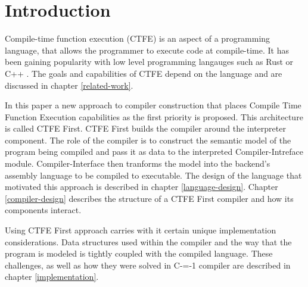 \section{Introduction}


Compile-time function execution (CTFE) is an aspect of a programming language, that allows the programmer to execute code at compile-time.
It has been gaining popularity with low level programming langauges such as Rust \cite{rust} or C++ \cite{ISO:cpp98}.
The goals and capabilities of CTFE depend on the language and are discussed in chapter \ref{related-work}.

In this paper a new approach to compiler construction that places Compile Time Function Execution capabilities as the first priority is proposed.
This architecture is called CTFE First.
CTFE First builds the compiler around the interpreter component.
The role of the compiler is to construct the semantic model of the program being compiled and pass it as data to the interpreted Compiler-Intreface module.
Compiler-Interface then tranforms the model into the backend's assembly language to be compiled to executable.
The design of the language that motivated this approach is described in chapter \ref{language-design}.
Chapter \ref{compiler-design} describes the structure of a CTFE First compiler and how its components interact.

Using CTFE First approach carries with it certain unique implementation considerations.
Data structures used within the compiler and the way that the program is modeled is tightly coupled with the compiled language.
These challenges, as well as how they were solved in C-=-1 compiler are described in chapter \ref{implementation}.

